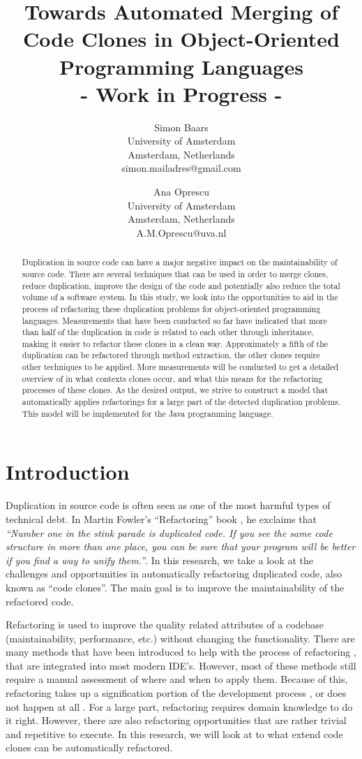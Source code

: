 \documentclass[a4paper]{article}
\title{Towards Automated Merging of Code Clones in Object-Oriented Programming Languages\\- Work in Progress -}
\author{
Simon Baars \\ University of Amsterdam\\
                Amsterdam, Netherlands \\ simon.mailadres@gmail.com
\and
Ana Oprescu \\ University of Amsterdam\\
                Amsterdam, Netherlands \\ A.M.Oprescu@uva.nl
}
\begin{document}
\maketitle

\begin{abstract}
Duplication in source code can have a major negative impact on the maintainability of source code. There are several techniques that can be used in order to merge clones, reduce duplication, improve the design of the code and potentially also reduce the total volume of a software system. In this study, we look into the opportunities to aid in the process of refactoring these duplication problems for object-oriented programming languages. Measurements that have been conducted so far have indicated that more than half of the duplication in code is related to each other through inheritance, making it easier to refactor these clones in a clean way. Approximately a fifth of the duplication can be refactored through method extraction, the other clones require other techniques to be applied. More measurements will be conducted to get a detailed overview of in what contexts clones occur, and what this means for the refactoring processes of these clones. As the desired output, we strive to construct a model that automatically applies refactorings for a large part of the detected duplication problems. This model will be implemented for the Java programming language.
\end{abstract}


\section{Introduction}
Duplication in source code is often seen as one of the most harmful types of technical debt. In Martin Fowler's ``Refactoring'' book \cite{fowler1999refactoring}, he exclaims that \textit{``Number one in the stink parade is duplicated code. If you see the same code structure in more than one place, you can be sure that your program will be better if you find a way to unify them.''}. In this research, we take a look at the challenges and opportunities in automatically refactoring duplicated code, also known as ``code clones''. The main goal is to improve the maintainability of the refactored code.

Refactoring is used to improve the quality related attributes of a codebase (maintainability, performance, etc.) without changing the functionality. There are many methods that have been introduced to help with the process of refactoring \cite{fowler1999refactoring, wake2004refactoring}, that are integrated into most modern IDE's. However, most of these methods still require a manual assessment of where and when to apply them. Because of this, refactoring takes up a signification portion of the development process \cite{lientz1978characteristics, mens2004survey}, or does not happen at all \cite{mens2003refactoring}. For a large part, refactoring requires domain knowledge to do it right. However, there are also refactoring opportunities that are rather trivial and repetitive to execute. In this research, we will look at to what extend code clones can be automatically refactored.
\end{document}
